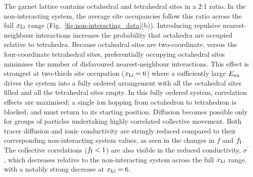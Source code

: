 \documentclass[aps,prb,twocolumn,superscriptaddress,reprint]{revtex4-1}
\newcommand{\xLi}{x_\m{Li}}
\begin{document}
The garnet lattice contains octahedral and tetrahedral sites in a 2:1 ratio. In the non-interacting system, the average site occupancies follow this ratio across the full $\xLi$ range (Fig.~\ref{fig:non-interacting_data}(b)). Introducing repulsive nearest-neighbour interactions increases the probability that octahedra are occupied relative to tetrahedra. Because octahedral sites are two-coordinate, versus the four-coordinate tetrahedral sites, preferentially occupying octahedral sites minimises the number of disfavoured nearest-neighbour interactions. This effect is strongest at two-thirds site occupation ($\xLi=6$) where a sufficiently large $E_{\mathrm{nn}}$ drives the system into a fully ordered arrangement with all the octahedral sites filled and all the tetrahedral sites empty. 
In this fully ordered system, correlation effects are maximised: a single ion hopping from octahedron to tetrahedron is blocked, and must return to its starting position. Diffusion becomes possible only for groups of particles undertaking highly correlated collective movement.\cite{BurbanoEtAl_PhysRevLett2016} Both tracer diffusion and ionic conductivity are stringly reduced compared to their corresponding non-interacting system values, as seen in the changes in $f$ and $f_{\mathrm{I}}$. The collective correlations ($f_{\mathrm{I}}<1$) are also visible in the reduced conductivity, $\sigma^\prime$, which decreases relative to the non-interacting system across the full $\xLi$ range, with a notably strong decrease at $\xLi=6$.
\end{document}
